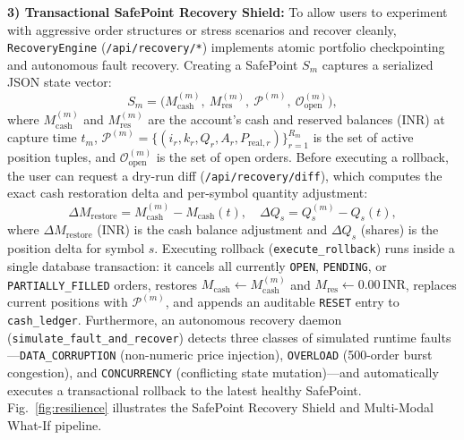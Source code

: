 \documentclass[journal,onecolumn,10pt]{IEEEtran}
\newcommand{\thinunit}[2]{#1\,\text{#2}}
\begin{document}
\textbf{3) Transactional SafePoint Recovery Shield:} To allow users to experiment with aggressive order structures or stress scenarios and recover cleanly, \texttt{RecoveryEngine} (\texttt{/api/recovery/*}) implements atomic portfolio checkpointing and autonomous fault recovery. Creating a SafePoint $S_m$ captures a serialized JSON state vector:
\begin{equation}
S_m = \bigl(M^{(m)}_{\mathrm{cash}},\ M^{(m)}_{\mathrm{res}},\ \mathcal{P}^{(m)},\ \mathcal{O}^{(m)}_{\mathrm{open}}\bigr),
\label{eq:safepoint}
\end{equation}
where $M^{(m)}_{\mathrm{cash}}$ and $M^{(m)}_{\mathrm{res}}$ are the account's cash and reserved balances (INR) at capture time $t_m$, $\mathcal{P}^{(m)} = \{(i_r, k_r, Q_r, A_r, P_{\mathrm{real},r})\}_{r=1}^{R_m}$ is the set of active position tuples, and $\mathcal{O}^{(m)}_{\mathrm{open}}$ is the set of open orders. Before executing a rollback, the user can request a dry-run diff (\texttt{/api/recovery/diff}), which computes the exact cash restoration delta and per-symbol quantity adjustment:
\begin{equation}
\Delta M_{\mathrm{restore}} = M^{(m)}_{\mathrm{cash}} - M_{\mathrm{cash}}(t),\quad \Delta Q_{s} = Q^{(m)}_{s} - Q_{s}(t),
\label{eq:rollback}
\end{equation}
where $\Delta M_{\mathrm{restore}}$ (INR) is the cash balance adjustment and $\Delta Q_{s}$ (shares) is the position delta for symbol $s$. Executing rollback (\texttt{execute\_rollback}) runs inside a single database transaction: it cancels all currently \texttt{OPEN}, \texttt{PENDING}, or \texttt{PARTIALLY\_FILLED} orders, restores $M_{\mathrm{cash}} \leftarrow M^{(m)}_{\mathrm{cash}}$ and $M_{\mathrm{res}} \leftarrow \thinunit{0.00}{INR}$, replaces current positions with $\mathcal{P}^{(m)}$, and appends an auditable \texttt{RESET} entry to \texttt{cash\_ledger}. Furthermore, an autonomous recovery daemon (\texttt{simulate\_fault\_and\_recover}) detects three classes of simulated runtime faults—\texttt{DATA\_CORRUPTION} (non-numeric price injection), \texttt{OVERLOAD} (500-order burst congestion), and \texttt{CONCURRENCY} (conflicting state mutation)—and automatically executes a transactional rollback to the latest healthy SafePoint. Fig.~\ref{fig:resilience} illustrates the SafePoint Recovery Shield and Multi-Modal What-If pipeline.
\end{document}
